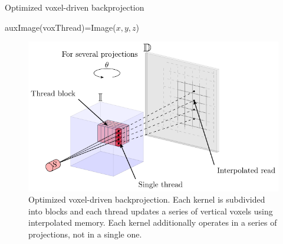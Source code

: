 \begin{algorithm}

\caption{Optimized voxel-driven backprojection
\label{alg:optimizedback}}
\begin{algorithmic}[1]

\State auxImage(voxThread)=Image($x,y,z$)
\EndFor  
{}
\EndFor
\EndFor
{}
\EndFor
\Ensure{} 
\EndFor

\end{algorithmic}

\end{algorithm}
\begin{figure}
\begin{center}

\includegraphics{GPUmethods/optbackproj-figure0.pdf} 
\end{center}

\caption[Diagram of multiple-voxel, multilpe-angle backprojection]{\label{fig:optback} Optimized voxel-driven backprojection. Each kernel is subdivided into blocks and each thread updates a series of vertical voxels using interpolated memory. Each kernel additionally operates in a series of projections, not in a single one.} 
\end{figure}

